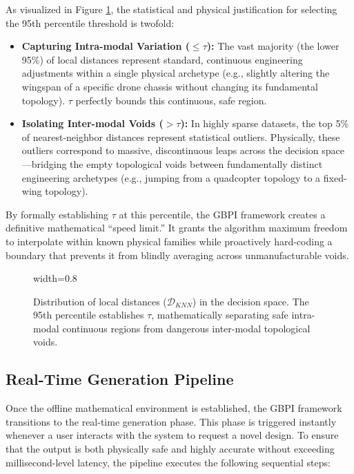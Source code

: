 \begin{enumerate}
    As visualized in Figure \ref{fig:dmax_distribution}, the statistical and physical justification for selecting the 95th percentile threshold is twofold:
    \begin{itemize}
        \item \textbf{Capturing Intra-modal Variation ($\le \tau$):} The vast majority (the lower 95\%) of local distances represent standard, continuous engineering adjustments within a single physical archetype (e.g., slightly altering the wingspan of a specific drone chassis without changing its fundamental topology). $\tau$ perfectly bounds this continuous, safe region.
        \item \textbf{Isolating Inter-modal Voids ($> \tau$):} In highly sparse datasets, the top 5\% of nearest-neighbor distances represent statistical outliers. Physically, these outliers correspond to massive, discontinuous leaps across the decision space—bridging the empty topological voids between fundamentally distinct engineering archetypes (e.g., jumping from a quadcopter topology to a fixed-wing topology). 
    \end{itemize}

    By formally establishing $\tau$ at this percentile, the GBPI framework creates a definitive mathematical ``speed limit.'' It grants the algorithm maximum freedom to interpolate within known physical families while proactively hard-coding a boundary that prevents it from blindly averaging across unmanufacturable voids.
\end{enumerate}

\begin{figure}[!htbp]
    \centering
  \begin{adjustbox}{width=0.8\linewidth}
      
  \end{adjustbox}
    \caption[Distribution of Local Distances for $\tau$]{Distribution of local distances ($\mathcal{D}_{KNN}$) in the decision space. The 95th percentile establishes $\tau$, mathematically separating safe intra-modal continuous regions from dangerous inter-modal topological voids.}
    \label{fig:dmax_distribution}
\end{figure}

\subsection{Real-Time Generation Pipeline}
\label{subsec:gbpi_online_phase}

Once the offline mathematical environment is established, the GBPI framework transitions to the real-time generation phase. This phase is triggered instantly whenever a user interacts with the system to request a novel design. To ensure that the output is both physically safe and highly accurate without exceeding millisecond-level latency, the pipeline executes the following sequential steps:

